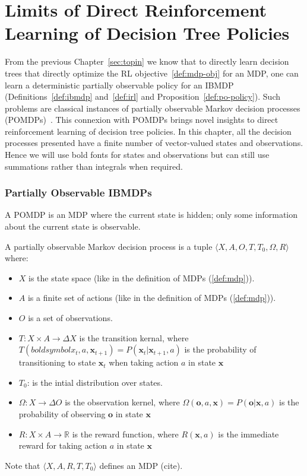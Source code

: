 \chapter{Limits of Direct Reinforcement Learning of Decision Tree Policies}\label{sec:pomdp}

From the previous Chapter~\ref{sec:topin} we know that to directly learn decision trees that directly optimize the RL objective~\ref{def:mdp-obj} for an MDP, one can learn a deterministic partially observable policy for an IBMDP (Definitions~\ref{def:ibmdp} and~\ref{def:irl} and Proposition~\ref{def:po-policy}).
Such problems are classical instances of partially observable Markov decision processes (POMDPs)~\cite{POMDP,chap2}.
This connexion with POMDPs brings novel insights to direct reinforcement learning of decision tree policies. 
In this chapter, all the decision processes presented have a finite number of vector-valued states and observations.
Hence we will use bold fonts for states and observations but can still use summations rather than integrals when required.

\subsection{Partially Observable IBMDPs}\label{sec:poibmdp}
A POMDP is an MDP where the current state is hidden; only some information about the current state is observable.

\begin{definition}\label{def:pomdp}
A partially observable Markov decision process is a tuple $\langle X, A, O, T, T_0, \Omega, R\rangle$ where:
\begin{itemize}
    \item $X$ is the state space (like in the definition of MDPs (\ref{def:mdp})).
    \item $A$ is a finite set of actions (like in the definition of MDPs (\ref{def:mdp})).
    \item $O$ is a set of observations.
    \item $T: X \times A \rightarrow \Delta X$ is the transition kernal, where $T(boldsymbol{x}_t, a, \boldsymbol{x}_{t+1}) = P(\boldsymbol{x}_t|\boldsymbol{x}_{t+1}, a)$ is the probability of transitioning to state $\boldsymbol{x}_{t}$ when taking action $a$ in state $\boldsymbol{x}$
    \item $T_0$: is the intial distribution over states. 
    \item $\Omega: X \rightarrow \Delta O$ is the observation kernel, where $\Omega(\boldsymbol{o}, a, \boldsymbol{x}) = P(\boldsymbol{o}|\boldsymbol{x}, a)$ is the probability of observing $\boldsymbol{o}$ in state $\boldsymbol{x}$
    \item $R: X \times A \rightarrow \mathbb{R}$ is the reward function, where $R(\boldsymbol{x}, a)$ is the immediate reward for taking action $a$ in state $\boldsymbol{x}$
\end{itemize}
Note that $\langle X, A, R, T, T_0 \rangle$ defines an MDP (cite).
\end{definition}

